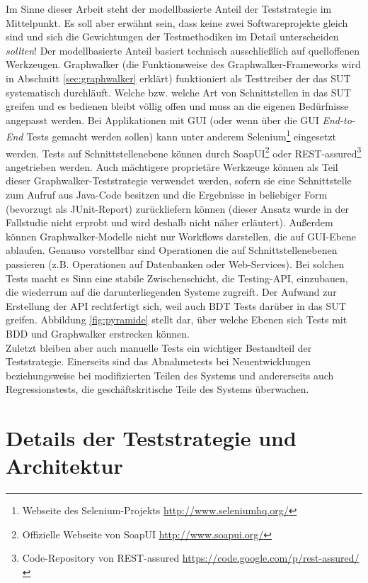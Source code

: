 Im Sinne dieser Arbeit steht der modellbasierte Anteil der Teststrategie im Mittelpunkt. Es soll aber erwähnt sein, dass keine zwei Softwareprojekte gleich sind und sich die Gewichtungen der Testmethodiken im Detail unterscheiden \textit{sollten}! Der modellbasierte Anteil basiert technisch ausschließlich auf quelloffenen Werkzeugen. Graphwalker (die Funktionsweise des Graphwalker-Frameworks wird in Abschnitt \ref{sec:graphwalker} erklärt) funktioniert als Testtreiber der das \Gls{SUT} systematisch durchläuft. Welche bzw. welche Art von Schnittstellen in das \Gls{SUT} greifen und es bedienen bleibt völlig offen und muss an die eigenen Bedürfnisse angepasst werden. Bei Applikationen mit GUI (oder wenn über die GUI \textit{End-to-End} Tests gemacht werden sollen) kann unter anderem Selenium\footnote{Webseite des Selenium-Projekts \url{http://www.seleniumhq.org/}} eingesetzt werden. Tests auf Schnittstellenebene können durch SoapUI\footnote{Offizielle Webseite von SoapUI \url{http://www.soapui.org/}} oder REST-assured\footnote{Code-Repository von REST-assured \url{https://code.google.com/p/rest-assured/}} angetrieben werden. Auch mächtigere proprietäre Werkzeuge können als Teil dieser Graphwalker-Teststrategie verwendet werden, sofern sie eine Schnittstelle zum Aufruf aus Java-Code besitzen und die Ergebnisse in beliebiger Form (bevorzugt als JUnit-Report) zurückliefern können (dieser Ansatz wurde in der Fallstudie nicht erprobt und wird deshalb nicht näher erläutert). Außerdem können Graphwalker-Modelle nicht nur Workflows darstellen, die auf GUI-Ebene ablaufen. Genauso vorstellbar sind Operationen die auf Schnittstellenebenen passieren (z.B. Operationen auf Datenbanken oder Web-Services). Bei solchen Tests macht es Sinn eine stabile Zwischenschicht, die Testing-API, einzubauen, die wiederrum auf die darunterliegenden Systeme zugreift. Der Aufwand zur Erstellung der API rechtfertigt sich, weil auch \Gls{BDT} Tests darüber in das \Gls{SUT} greifen.
Abbildung \ref{fig:pyramide} stellt dar, über welche Ebenen sich Tests mit \Gls{BDD} und Graphwalker erstrecken können.\\
Zuletzt bleiben aber auch manuelle Tests ein wichtiger Bestandteil der Teststrategie. Einerseits sind das Abnahmetests bei Neuentwicklungen beziehungsweise bei modifizierten Teilen des Systems und andererseits auch Regressionstests, die geschäftskritische Teile des Systems überwachen.

\section{Details der Teststrategie und Architektur}
\label{sec:details}


